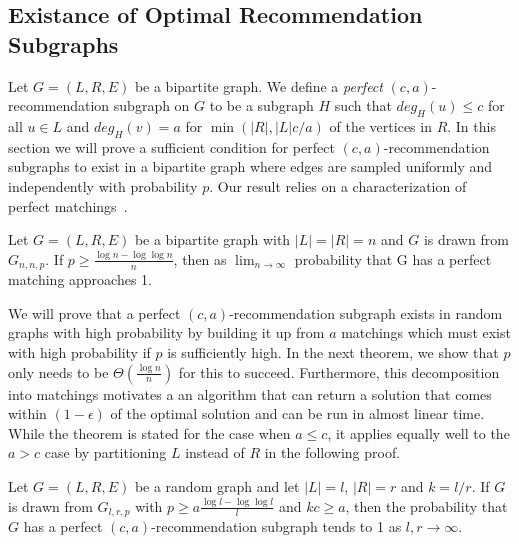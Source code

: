 \subsection{Existance of Optimal Recommendation Subgraphs}
Let $G=(L,R,E)$ be a bipartite graph. We define a \emph{perfect}
$(c,a)$-recommendation subgraph on $G$ to be a subgraph $H$ such that $deg_H(u)\leq c$
for all $u\in L$ and $deg_H(v)=a$ for $\min(|R|,|L|c/a)$ of the vertices in $R$. In
this section we will prove a sufficient condition for perfect
$(c,a)$-recommendation subgraphs to exist in a bipartite graph where edges are
sampled uniformly and independently with probability $p$. Our result relies on a
characterization of perfect matchings~\cite{Janson2011}.

\begin{thm}
\label{random_matching_threshold}
Let $G=(L,R,E)$ be a bipartite graph with $|L| = |R| = n$ and $G$ is drawn from $G_{n,n,p}$. If $p \geq \frac{\log n -
\log\log n}{n}$, then as $\lim_{n\to\infty}$ probability that G has a perfect
    matching approaches 1.
\end{thm}

We will prove that a perfect $(c,a)$-recommendation subgraph exists in
random graphs with high probability by building it up from $a$
matchings which must exist with high probability if $p$ is
sufficiently high. In the next theorem, we show that $p$ only needs to
be $\Theta(\frac{\log n}{n})$ for this to succeed. Furthermore, this
decomposition into matchings motivates a an algorithm that can return
a solution that comes within $(1-\epsilon)$ of the optimal solution
and can be run in almost linear time. While the theorem is stated for
the case when $a \leq c$, it applies equally well to the $a > c$
case by partitioning $L$ instead of $R$ in the following proof.

\begin{thm}
Let $G=(L,R,E)$ be a random graph and let $|L|=l$, $|R|=r$ and
$k=l/r$. If $G$ is drawn from $G_{l,r,p}$ with $p\geq a\frac{\log l-\log\log
l}{l}$ and $kc \geq a$, then the probability that $G$ has a perfect $(c, a)$-recommendation
subgraph tends to 1 as $l,r\to\infty$.
\end{thm}

